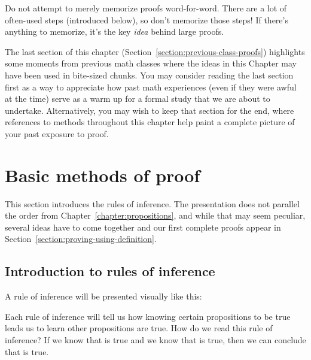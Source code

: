 \documentclass{book}
\theoremstyle{ekimcustom}
\begin{document}
Do not attempt to merely memorize proofs word-for-word. There are a lot of often-used steps (introduced below), so don't memorize those steps! If there's anything to memorize, it's the key \emph{idea} behind large proofs.

The last section of this chapter (Section~\ref{section:previous-class-proofs}) highlights some moments from previous math classes where the ideas in this Chapter may have been used in bite-sized chunks. You may consider reading the last section first as a way to appreciate how past math experiences (even if they were awful at the time) serve as a warm up for a formal study that we are about to undertake. Alternatively, you may wish to keep that section for the end, where references to methods throughout this chapter help paint a complete picture of your past exposure to proof.

\section{Basic methods of proof}\label{section:basic-methods-of-proof}

This section introduces the rules of inference. The presentation does not parallel the order from Chapter~\ref{chapter:propositions}, and while that may seem peculiar, several ideas have to come together and our first complete proofs appear in Section~\ref{section:proving-using-definition}.

\subsection{Introduction to rules of inference}\label{section:description}

A rule of inference will be presented visually like this:
\begin{center}
\end{center}
Each rule of inference will tell us how knowing certain propositions to be true leads us to learn other propositions are true. How do we read this rule of inference? If we know that  is true and we know that  is true, then we can conclude that  is true.
\end{document}
